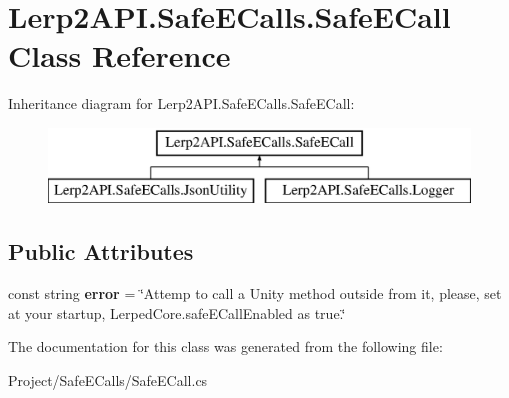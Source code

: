 \hypertarget{class_lerp2_a_p_i_1_1_safe_e_calls_1_1_safe_e_call}{}\section{Lerp2\+A\+P\+I.\+Safe\+E\+Calls.\+Safe\+E\+Call Class Reference}
\label{class_lerp2_a_p_i_1_1_safe_e_calls_1_1_safe_e_call}
Inheritance diagram for Lerp2\+A\+P\+I.\+Safe\+E\+Calls.\+Safe\+E\+Call\+:\begin{figure}[H]
\begin{center}
\leavevmode
\includegraphics[height=2.000000cm]{class_lerp2_a_p_i_1_1_safe_e_calls_1_1_safe_e_call}
\end{center}
\end{figure}
\subsection*{Public Attributes}
\begin{DoxyCompactItemize}
\item 
\mbox{\label{class_lerp2_a_p_i_1_1_safe_e_calls_1_1_safe_e_call_a3b3027c61058c00eb2ab7a7f8de482fe}} 
const string {\bfseries error} = \char`\"{}Attemp to call a Unity method outside from it, please, set at your startup, \textquotesingle{}Lerped\+Core.\+safe\+E\+Call\+Enabled\textquotesingle{} as true.\char`\"{}
\end{DoxyCompactItemize}


The documentation for this class was generated from the following file\+:\begin{DoxyCompactItemize}
\item 
Project/\+Safe\+E\+Calls/Safe\+E\+Call.\+cs\end{DoxyCompactItemize}
